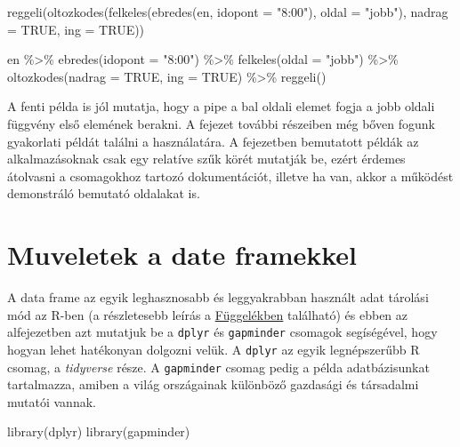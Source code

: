 \documentclass[
]{book}
\newenvironment{Shaded}{\begin{snugshade}}{\end{snugshade}}
\newcommand{\AttributeTok}[1]{\textcolor[rgb]{0.77,0.63,0.00}{#1}}
\newcommand{\ConstantTok}[1]{\textcolor[rgb]{0.00,0.00,0.00}{#1}}
\newcommand{\FunctionTok}[1]{\textcolor[rgb]{0.00,0.00,0.00}{#1}}
\newcommand{\NormalTok}[1]{#1}
\newcommand{\SpecialCharTok}[1]{\textcolor[rgb]{0.00,0.00,0.00}{#1}}
\newcommand{\StringTok}[1]{\textcolor[rgb]{0.31,0.60,0.02}{#1}}
\begin{document}
\begin{Shaded}
\begin{Highlighting}[]
\FunctionTok{reggeli}\NormalTok{(}\FunctionTok{oltozkodes}\NormalTok{(}\FunctionTok{felkeles}\NormalTok{(}\FunctionTok{ebredes}\NormalTok{(en, }\AttributeTok{idopont =} \StringTok{"8:00"}\NormalTok{), }\AttributeTok{oldal =} \StringTok{"jobb"}\NormalTok{), }\AttributeTok{nadrag =} \ConstantTok{TRUE}\NormalTok{, }\AttributeTok{ing =} \ConstantTok{TRUE}\NormalTok{))}

\NormalTok{en }\SpecialCharTok{\%\textgreater{}\%} 
  \FunctionTok{ebredes}\NormalTok{(}\AttributeTok{idopont =} \StringTok{"8:00"}\NormalTok{) }\SpecialCharTok{\%\textgreater{}\%} 
  \FunctionTok{felkeles}\NormalTok{(}\AttributeTok{oldal =} \StringTok{"jobb"}\NormalTok{) }\SpecialCharTok{\%\textgreater{}\%} 
  \FunctionTok{oltozkodes}\NormalTok{(}\AttributeTok{nadrag =} \ConstantTok{TRUE}\NormalTok{, }\AttributeTok{ing =} \ConstantTok{TRUE}\NormalTok{) }\SpecialCharTok{\%\textgreater{}\%} 
  \FunctionTok{reggeli}\NormalTok{()}
\end{Highlighting}
\end{Shaded}

A fenti példa is jól mutatja, hogy a pipe a bal oldali elemet fogja a
jobb oldali függvény első elemének berakni. A fejezet további részeiben
még bőven fogunk gyakorlati példát találni a használatára. A fejezetben
bemutatott példák az alkalmazásoknak csak egy relatíve szűk körét
mutatják be, ezért érdemes átolvasni a csomagokhoz tartozó
dokumentációt, illetve ha van, akkor a működést demonstráló bemutató
oldalakat is.

\hypertarget{muveletek-a-date-framekkel}{%
\section{Muveletek a date framekkel}\label{muveletek-a-date-framekkel}}

A data frame az egyik leghasznosabb és leggyakrabban használt adat
tárolási mód az R-ben (a részletesebb leírás a
\protect\hyperlink{data-frame}{Függelékben} található) és ebben az
alfejezetben azt mutatjuk be a \texttt{dplyr} és \texttt{gapminder}
csomagok segíségével, hogy hogyan lehet hatékonyan dolgozni velük. A
\texttt{dplyr} az egyik legnépszerűbb R csomag, a \emph{tidyverse}
része. A \texttt{gapminder} csomag pedig a példa adatbázisunkat
tartalmazza, amiben a világ országainak különböző gazdasági és
társadalmi mutatói vannak.

\begin{Shaded}
\begin{Highlighting}[]
\FunctionTok{library}\NormalTok{(dplyr)}
\FunctionTok{library}\NormalTok{(gapminder)}
\end{Highlighting}
\end{Shaded}
\end{document}
